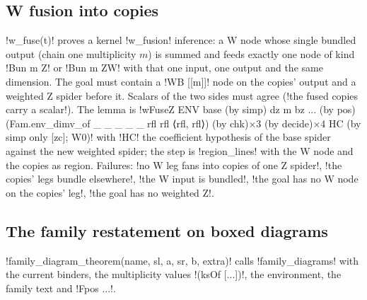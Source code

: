 {\subsection{W fusion into copies}\label{sec:lean-export-net-wfuse}

\py!w_fuse(t)! proves a kernel \code!w_fusion! inference: a W node whose single bundled output
(chain one multiplicity $m$) is summed and feeds exactly one node of kind \code!Bun m Z! or
\code!Bun m ZW! with that one input, one output and the same dimension. The goal must contain a
\code!WB [[m]]! node on the copies' output and a weighted Z spider before it. Scalars of the two
sides must agree (\code!the fused copies carry a scalar!). The lemma is
\code!wFuseZ ENV base (by simp) dz m bz ... (by pos) (Fam.env_dimv_of _ _ _ _ _ rfl rfl ⟨rfl, rfl⟩) (by chk)×3 (by decide)×4 HC (by simp only [zc]; W0)!
with \code!HC! the coefficient hypothesis of the base spider against the new weighted spider; the
step is \py!region_lines! with the W node and the copies as region. Failures:
\code!no W leg fans into copies of one Z spider!, \code!the copies' legs bundle elsewhere!,
\code!the W input is bundled!, \code!the goal has no W node on the copies' leg!,
\code!the goal has no weighted Z!.

\subsection{The family restatement on boxed diagrams}\label{sec:lean-export-net-boxed-literal}

\py!family_diagram_theorem(name, sl, a, sr, b, extra)! calls \py!family_diagrams! with the
current binders, the multiplicity values \code!(ksOf [...])!, the environment, the family text and
\code!Fpos ...!.

}
